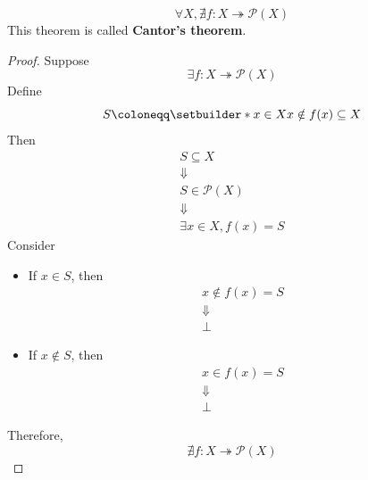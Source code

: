 \bigskip

\begin{theorem} \label{an:thm:cantors-theorem}
  \[
    \forall X, \nexists f: X \twoheadrightarrow \mathcal{P}(X)
  \]
  This theorem is called \textbf{Cantor's theorem}.
\end{theorem}

\begin{proof}
  Suppose
  \[
    \exists f: X \twoheadrightarrow \mathcal{P}(X)
  \]
  Define
  \[
    S \coloneqq \setbuilder*{x \in X}{x \notin f(x)} \subseteq X
  \]
  Then
  \[
    \begin{array}{c}
      S \subseteq X        \\
      \Downarrow           \\
      S \in \mathcal{P}(X) \\
      \Downarrow           \\
      \exists x \in X, f(x) = S
    \end{array}
  \]
  Consider
  \begin{itemize}
    \item If $x \in S$, then
          \[
            \begin{array}{c}
              x \notin f(x) = S \\
              \Downarrow        \\
              \bot
            \end{array}
          \]
    \item If $x \notin S$, then
          \[
            \begin{array}{c}
              x \in f(x) = S \\
              \Downarrow     \\
              \bot
            \end{array}
          \]
  \end{itemize}
  Therefore,
  \[
    \nexists f: X \twoheadrightarrow \mathcal{P}(X)
  \]
\end{proof}
